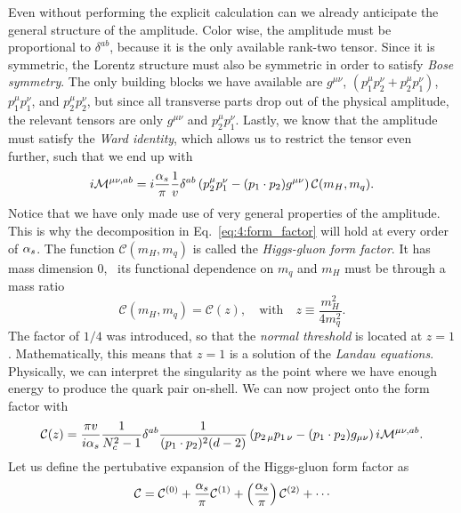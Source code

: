 Even without performing the explicit calculation can we already anticipate the general structure of the amplitude. Color wise, the amplitude must be proportional to $\delta^{ab}$, because it is the only available rank-two tensor. Since it is symmetric, the Lorentz structure must also be symmetric in order to satisfy \textit{Bose symmetry}. The only building blocks we have available are $g^{\mu\nu}$, $(p_1^\mu p_2^\nu + p_2^\mu p_1^\nu)$, $p_1^\mu p_1^\nu$, and $p_2^\mu p_2^\nu$, but since all transverse parts drop out of the physical amplitude, the relevant tensors are only $g^{\mu \nu}$ and $p_2^\mu p_1^\nu$. Lastly, we know that the amplitude must satisfy the \textit{Ward identity}, which allows us to restrict the tensor even further, such that we end up with
\begin{equation}
i \mathcal{M}^{\mu \nu, ab} = i\frac{\alpha_s}{\pi} \frac{1}{v} \delta^{ab} \left(p_2^\mu p_1^\nu - (p_1 \cdot p_2)g^{\mu\nu} \right) \mathcal{C}(m_H, m_q).
\label{eq:4:form_factor}
\end{equation}
Notice that we have only made use of very general properties of the amplitude. This is why the decomposition in Eq.~\eqref{eq:4:form_factor} will hold at every order of $\alpha_s$. The function $\mathcal{C}(m_H, m_q)$ is called the \textit{Higgs-gluon form factor}. It has mass dimension 0, \ie\ its functional dependence on $m_q$ and $m_H$ must be through a mass ratio
\begin{equation}
\mathcal{C} (m_H, m_q) = \mathcal{C}(z), \quad \text{with} \quad z \equiv \frac{m_H^2}{4 m_q^2}.
\end{equation}
The factor of $1/4$ was introduced, so that the \textit{normal threshold} is located at $z = 1$. Mathematically, this means that $z = 1$ is a solution of the \textit{Landau equations}. Physically, we can interpret the singularity as the point where we have enough energy to produce the quark pair on-shell. We can now project onto the form factor with
\begin{equation}
\mathcal{C}(z) = \frac{\pi v}{i \alpha_s} \frac{1}{N_c^2 - 1} \delta^{ab} \frac{1}{(p_1 \cdot p_2)^2 (d - 2)} \left(p_{2\,\mu} p_{1\,\nu} - (p_1 \cdot p_2) g_{\mu\nu} \right) i \mathcal{M}^{\mu \nu, ab}.
\end{equation}
Let us define the pertubative expansion of the Higgs-gluon form factor as
\begin{equation}
\mathcal{C} = \mathcal{C}^{(0)} + \frac{\alphas}{\pi} \mathcal{C}^{(1)} + \left( \frac{\alphas}{\pi} \right) \mathcal{C}^{(2)} + \cdots
\label{eq:4:form_factor_expansion}
\end{equation}

